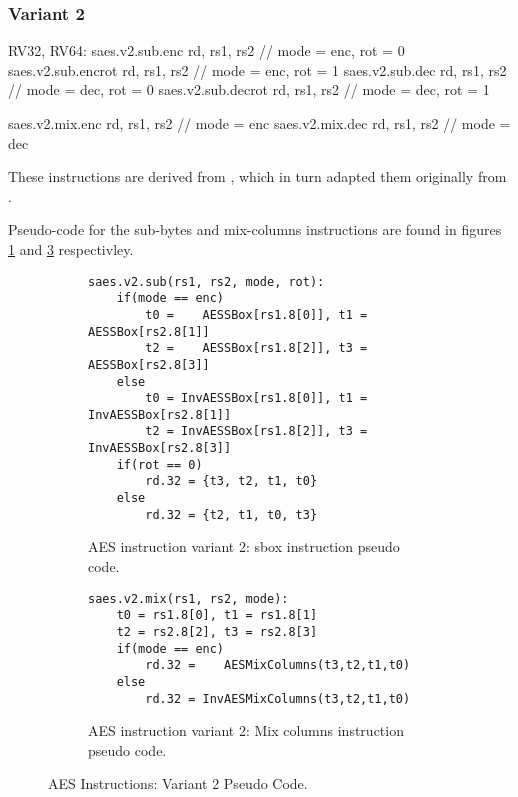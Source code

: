 \subsubsection{Variant 2}

\begin{cryptoisa}
RV32, RV64:
    saes.v2.sub.enc    rd, rs1, rs2 // mode = enc, rot = 0
    saes.v2.sub.encrot rd, rs1, rs2 // mode = enc, rot = 1
    saes.v2.sub.dec    rd, rs1, rs2 // mode = dec, rot = 0
    saes.v2.sub.decrot rd, rs1, rs2 // mode = dec, rot = 1

    saes.v2.mix.enc    rd, rs1, rs2 // mode = enc
    saes.v2.mix.dec    rd, rs1, rs2 // mode = dec
\end{cryptoisa}

These instructions are derived from \cite{MPP:19}, which in turn adapted
them originally from \cite{TG:06}.

Pseudo-code for the sub-bytes and mix-columns instructions are found in
figures
\ref{fig:pesudo:aes:v2:sub}
and
\ref{fig:pesudo:aes:v2:mix}
respectivley.

\begin{figure}
\begin{subfigure}[b]{1.0\textwidth}
\begin{lstlisting}
saes.v2.sub(rs1, rs2, mode, rot):
    if(mode == enc)
        t0 =    AESSBox[rs1.8[0]], t1 =    AESSBox[rs2.8[1]]
        t2 =    AESSBox[rs1.8[2]], t3 =    AESSBox[rs2.8[3]]
    else
        t0 = InvAESSBox[rs1.8[0]], t1 = InvAESSBox[rs2.8[1]]
        t2 = InvAESSBox[rs1.8[2]], t3 = InvAESSBox[rs2.8[3]]
    if(rot == 0)
        rd.32 = {t3, t2, t1, t0} 
    else
        rd.32 = {t2, t1, t0, t3}
\end{lstlisting}
\caption{AES instruction variant 2: sbox instruction pseudo code.}
\label{fig:pesudo:aes:v2:sub}
\end{subfigure}
\begin{subfigure}[b]{1.0\textwidth}
\begin{lstlisting}
saes.v2.mix(rs1, rs2, mode):
    t0 = rs1.8[0], t1 = rs1.8[1]
    t2 = rs2.8[2], t3 = rs2.8[3]
    if(mode == enc)
        rd.32 =    AESMixColumns(t3,t2,t1,t0)
    else
        rd.32 = InvAESMixColumns(t3,t2,t1,t0)
\end{lstlisting}
\caption{AES instruction variant 2: Mix columns instruction pseudo code.}
\label{fig:pesudo:aes:v2:mix}
\end{subfigure}
\caption{AES Instructions: Variant 2 Pseudo Code.}
\end{figure}

